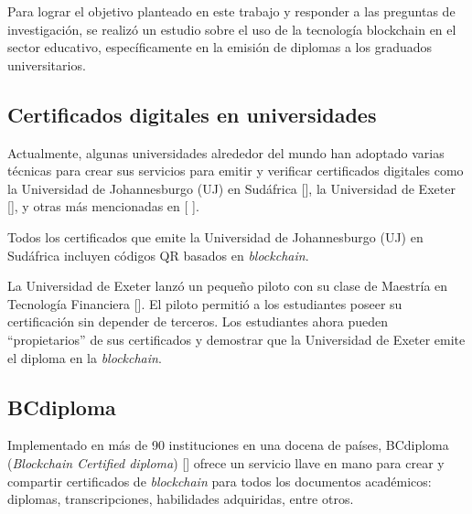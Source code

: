 
Para lograr el objetivo planteado en este trabajo y responder a las preguntas de investigación, se realizó un estudio sobre el uso de la tecnología blockchain en el sector educativo, específicamente en la emisión de diplomas a los graduados universitarios.

\subsection{Certificados digitales en universidades}
Actualmente, algunas universidades alrededor del mundo han adoptado varias técnicas para crear sus servicios para emitir y verificar certificados digitales como la Universidad de Johannesburgo (UJ) en Sudáfrica [\cite{80}], la Universidad de Exeter [\cite{76}], y otras más mencionadas en [ \cite{1}]. 

Todos los certificados que emite la Universidad de Johannesburgo (UJ) en Sudáfrica incluyen códigos QR basados en \textit{blockchain}. 

La Universidad de Exeter lanzó un pequeño piloto con su clase de Maestría en Tecnología Financiera [\cite{76}]. El piloto permitió a los estudiantes poseer su certificación sin depender de terceros. Los estudiantes ahora pueden ``propietarios'' de sus certificados y demostrar que la Universidad de Exeter emite el diploma en la \textit{blockchain}.

\subsection{BCdiploma}
Implementado en más de 90 instituciones en una docena de países, BCdiploma (\textit{Blockchain Certified diploma}) [\cite{75}] ofrece un servicio llave en mano para crear y compartir certificados de \textit{blockchain} para todos los documentos académicos: diplomas, transcripciones, habilidades adquiridas, entre otros. 

